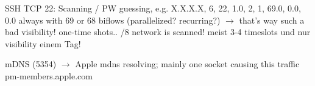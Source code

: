 SSH TCP 22: Scanning / PW guessing, e.g. X.X.X.X, 6, 22, 1.0, 2, 1, 69.0, 0.0, 0.0 always with 69 or 68 biflows (parallelized? recurring?) $\rightarrow$ that's way such a bad visibility! one-time shots.. /8 network is scanned! meist 3-4 timeslots und nur visibility einem Tag! 

mDNS (5354) $\rightarrow$ Apple mdns resolving; mainly one socket causing this traffic pm-members.apple.com
